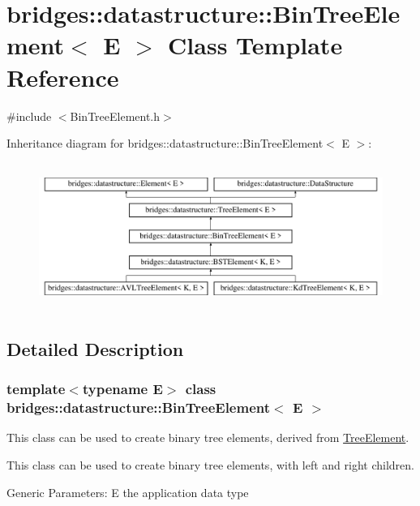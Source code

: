 \hypertarget{classbridges_1_1datastructure_1_1_bin_tree_element}{}\section{bridges\+:\+:datastructure\+:\+:Bin\+Tree\+Element$<$ E $>$ Class Template Reference}
\label{classbridges_1_1datastructure_1_1_bin_tree_element}


{\ttfamily \#include $<$Bin\+Tree\+Element.\+h$>$}

Inheritance diagram for bridges\+:\+:datastructure\+:\+:Bin\+Tree\+Element$<$ E $>$\+:\begin{figure}[H]
\begin{center}
\leavevmode
\includegraphics[height=4.794520cm]{classbridges_1_1datastructure_1_1_bin_tree_element}
\end{center}
\end{figure}


\subsection{Detailed Description}
\subsubsection*{template$<$typename E$>$\newline
class bridges\+::datastructure\+::\+Bin\+Tree\+Element$<$ E $>$}

This class can be used to create binary tree elements, derived from \hyperlink{classbridges_1_1datastructure_1_1_tree_element}{Tree\+Element}. 

This class can be used to create binary tree elements, with left and right children.

Generic Parameters\+: E the application data type

